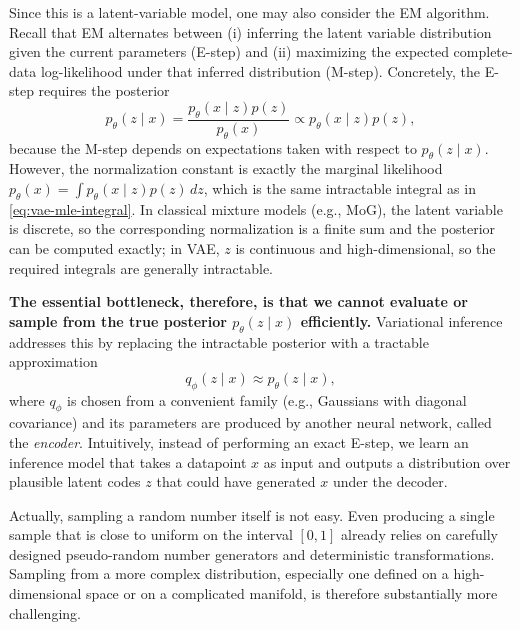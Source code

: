 \documentclass[../main]{subfiles}
\begin{document}
Since this is a latent-variable model, one may also consider the EM algorithm.
Recall that EM alternates between (i) inferring the latent variable distribution
given the current parameters (E-step) and (ii) maximizing the expected complete-data
log-likelihood under that inferred distribution (M-step). Concretely, the E-step
requires the posterior
\begin{equation}
    p_\theta(z\mid x)
    =
    \frac{p_\theta(x\mid z)p(z)}{p_\theta(x)}
    \propto p_\theta(x\mid z)p(z),
\end{equation}
because the M-step depends on expectations taken with respect to $p_\theta(z\mid x)$.
However, the normalization constant is exactly the marginal likelihood
$p_\theta(x)=\int p_\theta(x\mid z)p(z)\,dz$, which is the same intractable integral
as in \eqref{eq:vae-mle-integral}. In classical mixture models (e.g., MoG), the latent
variable is discrete, so the corresponding normalization is a finite sum and the
posterior can be computed exactly; in VAE, $z$ is continuous and high-dimensional,
so the required integrals are generally intractable.

\textbf{The essential bottleneck, therefore, is that we cannot evaluate or sample from the
true posterior $p_\theta(z\mid x)$ efficiently.} Variational inference addresses this
by replacing the intractable posterior with a tractable approximation
\begin{equation}
    q_\phi(z\mid x)\approx p_\theta(z\mid x),
\end{equation}
where $q_\phi$ is chosen from a convenient family (e.g., Gaussians with diagonal
covariance) and its parameters are produced by another neural network, called the
\emph{encoder}. Intuitively, instead of performing an exact E-step, we learn an
inference model that takes a datapoint $x$ as input and outputs a distribution
over plausible latent codes $z$ that could have generated $x$ under the decoder.
\begin{remark}
    Actually, sampling a random number itself is not easy. Even producing a single
    sample that is close to uniform on the interval $[0,1]$ already relies on
    carefully designed pseudo-random number generators and deterministic
    transformations. Sampling from a more complex distribution, especially one
    defined on a high-dimensional space or on a complicated manifold, is therefore
    substantially more challenging.
\end{remark}
\end{document}
